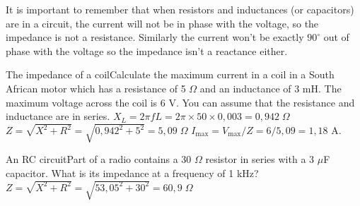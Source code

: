 
It is important to remember that when resistors and inductances (or capacitors) are in a circuit, the current will not be in phase with the voltage, so the impedance is not  a resistance.  Similarly the current won't be exactly $90^{\circ}$ out of phase with the voltage so the impedance isn't a reactance either.

\begin{wex}{The impedance of a coil}{Calculate the maximum current in a coil in a South African motor which has a resistance of 5 $\Omega$ and an inductance of 3 mH.  The maximum voltage across the coil is 6 V.  You can assume that the resistance and inductance are in series.}{  $X_{L} = 2 \pi f L = 2 \pi \times 50 \times 0,003 = 0,942 \; \Omega$ 
 $Z = \sqrt{X^{2} + R^{2}} = \sqrt{ 0,942^{2} + 5^{2}} = 5,09 \; \Omega$
 $I_{\mathrm{max}} = V_{\mathrm{max}} / Z = 6 / 5,09 = 1,18$ A. }
\end{wex}

\begin{wex}{An RC circuit}{Part of a radio contains a 30 $\Omega$ resistor in series with a 3 $\mu$F capacitor.  What is its impedance at a frequency of 1 kHz?}{ 
 $Z = \sqrt{X^{2} + R^{2}} = \sqrt{ 53,05^{2} + 30^{2}} = 60,9 \; \Omega$ }
\end{wex}


